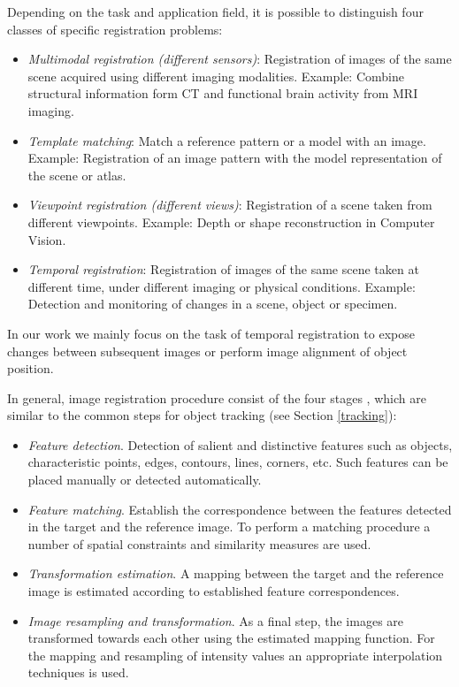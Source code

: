 Depending on the task and application field, it is possible to distinguish four classes of specific registration problems:
\begin{itemize}
\item \textit{Multimodal registration (different sensors)}: Registration of images of the same scene acquired using different imaging modalities. Example: Combine structural information form CT and functional brain activity from MRI imaging.

\item \textit{Template matching}: Match a reference pattern or a model with an image. Example: Registration of an image pattern with the model representation of the scene or atlas. 

\item \textit{Viewpoint registration (different views)}: Registration of a scene taken from different viewpoints. Example: Depth or shape reconstruction in Computer Vision.
 
\item \textit{Temporal registration}: Registration of images of the same scene taken at different time, under different imaging or physical conditions. Example: Detection and monitoring of changes in a scene, object or specimen.

\end{itemize}
In our work we mainly focus on the task of temporal registration to expose changes between subsequent images or perform image alignment of object position.

In general, image registration procedure consist of the four stages \cite{Zitova03}, which are similar to the common steps for object tracking (see Section \ref{tracking}):
\begin{itemize}

\item \textit{Feature detection}. Detection of salient and distinctive features such as objects, characteristic points, edges, contours, lines, corners, etc.
Such features can be placed manually or detected automatically.

\item  \textit{Feature matching}. Establish the correspondence between the features detected in the target and the reference image. To perform a matching procedure a number of spatial constraints and similarity measures are used.  

\item \textit{Transformation estimation}. A mapping between the target and the reference image is estimated according to established feature correspondences. 

\item \textit{Image resampling and transformation}. As a final step, the images are transformed towards each other using the estimated mapping function. For the mapping and resampling of intensity values an appropriate interpolation techniques is used.

\end{itemize}

